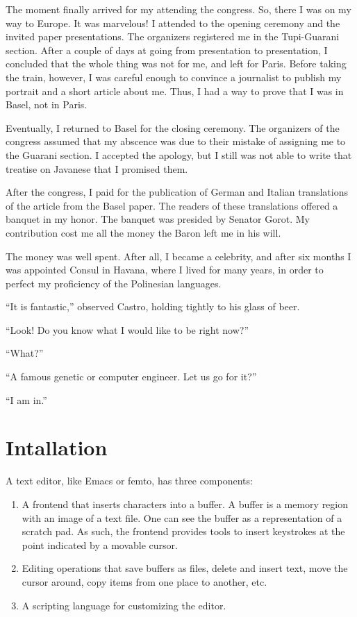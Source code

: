 \documentclass[a4paper,12pt]{book}
\begin{document}
The moment finally arrived for my
attending the congress. So, there
I was on my way to Europe.
It was marvelous! I attended to
the opening ceremony and the invited
paper presentations. The organizers
registered me in the Tupi-Guarani
section. After a couple of days at
going from presentation to presentation,
I concluded that the whole thing was
not for me, and left for Paris.
Before taking the train, however,
I was careful enough to convince a
journalist to publish my portrait
and a short article about me. Thus,
I had a way to prove that I was in
Basel, not in Paris.

Eventually, I returned to Basel for
the closing ceremony. The organizers
of the congress assumed that my
abscence was due to their mistake
of assigning me to the Guarani section.
I accepted the apology, but I still
was not able to write that treatise
on Javanese that I promised them.

After the congress, I paid for the publication
of German and Italian translations of the article
from the Basel paper. The readers of these
translations offered a banquet in my honor.
The banquet was presided by Senator Gorot.
My contribution cost me all the money
the Baron left me in his will.

The money was well spent. After all,
I became a celebrity, and after six
months I was appointed Consul in
Havana, where I lived for many years,
in order to perfect my proficiency
of the Polinesian languages.

``It is fantastic,'' observed Castro, holding
tightly to his glass of beer.

``Look! Do you know what I would like to
be right now?''

``What?''

``A famous genetic or computer engineer. Let us
go for it?''

``I am in.''


\chapter{Intallation}  
A text editor, like Emacs or femto, has three components:
\begin{enumerate}
  \item A frontend that inserts characters into a buffer.
    A buffer is a memory region with an image of a
    text file. One can see the buffer as a representation
    of a scratch pad. As such, the frontend provides tools to
  insert keystrokes at the  point indicated by 
  a movable cursor.
\item Editing operations that save buffers
  as files, delete and insert text, move the
  cursor around, copy items from one place to another, etc.
\item A scripting language for customizing the editor.
\end{enumerate}
\end{document}

